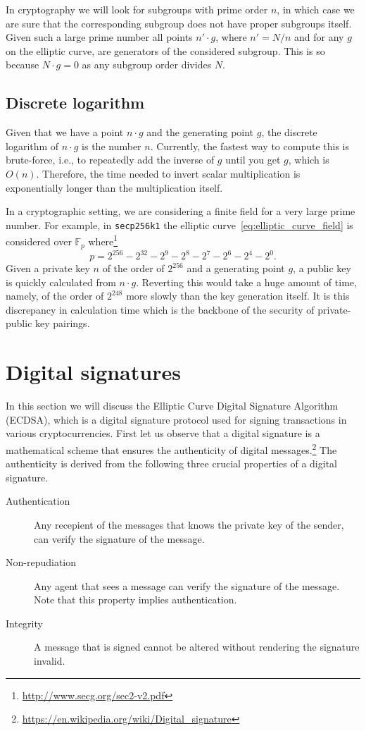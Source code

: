 \documentclass{article}
\begin{document}
In cryptography we will look for subgroups with prime order $n$, in which case
we are sure that the corresponding subgroup does not have proper subgroups
itself. Given such a large prime number all points $n' \cdot g$, where $n' =
N/n$ and for any $g$ on the elliptic curve, are generators of the considered
subgroup. This is so because $N \cdot g = 0$ as any subgroup order divides $N$.

\subsection{Discrete logarithm}

Given that we have a point $n \cdot g$ and the generating point $g$, the
discrete logarithm of $n\cdot g$ is the number $n$. Currently, the fastest way
to compute this is brute-force, i.e., to repeatedly add the inverse of $g$ until
you get $g$, which is $O(n)$. Therefore, the time needed to invert scalar
multiplication is exponentially longer than the multiplication itself.

In a cryptographic setting, we are considering a finite field for a very large
prime number. For example, in \verb|secp256k1| the elliptic
curve~\eqref{eq:elliptic_curve_field} is considered over $\mathbb{F}_p$ where\footnote{
    \url{http://www.secg.org/sec2-v2.pdf}} 
\begin{equation*}
    p = 2^{256} - 2^{32} - 2^9 - 2^8 - 2^7 - 2^6 - 2^4 - 2^0.
\end{equation*}
Given a private key $n$ of the order of $2^{256}$ and a generating point $g$, a
public key is quickly calculated from $n \cdot g$.  Reverting this would take a
huge amount of time, namely, of the order of $2^{248}$ more slowly than the key
generation itself. It is this discrepancy in calculation time which is the backbone
of the security of private-public key pairings.

\section{Digital signatures}

In this section we will discuss the Elliptic Curve Digital Signature Algorithm
(ECDSA), which is a digital signature protocol used for signing transactions in
various cryptocurrencies. First let us observe that a digital signature is a
mathematical scheme that ensures the authenticity of digital messages.\footnote{
    \url{https://en.wikipedia.org/wiki/Digital_signature}}
The authenticity is derived from the following three crucial properties of a
digital signature.
\begin{description}
    \item[Authentication] Any recepient of the messages that knows the private
        key of the sender, can verify the signature of the message.
    \item[Non-repudiation] Any agent that sees a message can verify the
        signature of the message. Note that this property implies
        authentication.
    \item[Integrity] A message that is signed cannot be altered without
        rendering the signature invalid.
\end{description}
\end{document}
